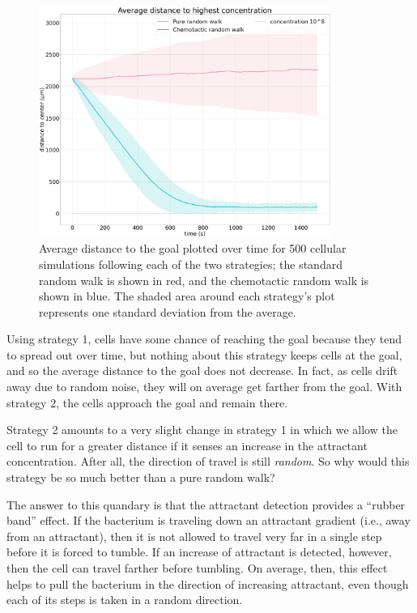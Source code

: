 \begin{figure}[h]
\centering
\mySfFamily
\includegraphics[width = 0.85\textwidth]{../images/chemotaxis_performance_compare_uniform.png}
\caption{Average distance to the goal plotted over time for 500 cellular simulations following each of the two strategies; the standard random walk is shown in red, and the chemotactic random walk is shown in blue. The shaded area around each strategy's plot represents one standard deviation from the average.}
\label{fig:chemotaxis_performance_compare_uniform}
\end{figure}


Using strategy 1, cells have some chance of reaching the goal because they tend to spread out over time, but nothing about this strategy keeps cells at the goal, and so the average distance to the goal does not decrease. In fact, as cells drift away due to random noise, they will on average get farther from the goal. With strategy 2, the cells approach the goal and remain there.

Strategy 2 amounts to a very slight change in strategy 1 in which we allow the cell to run for a greater distance if it senses an increase in the attractant concentration. After all, the direction of travel is still \textit{random}. So why would this strategy be so much better than a pure random walk?

The answer to this quandary is that the attractant detection provides a ``rubber band'' effect. If the bacterium is traveling down an attractant gradient (i.e., away from an attractant), then it is not allowed to travel very far in a single step before it is forced to tumble. If an increase of attractant is detected, however, then the cell can travel farther before tumbling. On average, then, this effect helps to pull the bacterium in the direction of increasing attractant, even though each of its steps is taken in a random direction.

